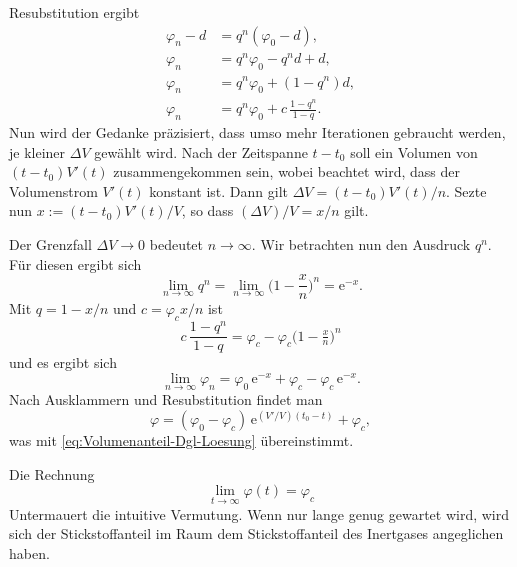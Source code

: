 \documentclass[a4paper,10pt,fleqn,twocolumn,twoside]{scrartcl}
\numberwithin{equation}{section}
\newcommand{\ee}{\mathrm e}
\begin{document}
Resubstitution ergibt
\begin{align}
\varphi_n-d &= q^n (\varphi_0-d),\\
\varphi_n &= q^n\varphi_0-q^n d+d,\\
\varphi_n &= q^n\varphi_0+(1-q^n)d,\\
\varphi_n &= q^n\varphi_0+c\,\frac{1-q^n}{1-q}.
\end{align}
Nun wird der Gedanke präzisiert, dass umso mehr Iterationen
gebraucht werden, je kleiner $\Delta V$ gewählt wird.
Nach der Zeitspanne $t-t_0$ soll ein Volumen von $(t-t_0)V'(t)$
zusammengekommen sein, wobei beachtet wird, dass der Volumenstrom
$V'(t)$ konstant ist. Dann gilt $\Delta V = (t-t_0)V'(t)/n$.
Sezte nun $x:=(t-t_0)V'(t)/V$, so dass $(\Delta V)/V=x/n$ gilt.
 
Der Grenzfall $\Delta V\to 0$ bedeutet $n\to\infty$.
Wir betrachten nun den Ausdruck $q^n$. Für diesen ergibt sich%
\begin{equation}
\lim_{n\to\infty} q^n = \lim_{n\to\infty} \Big(1-\frac{x}{n}\Big)^n
= \ee^{-x}.
\end{equation}
Mit $q=1-x/n$ und $c=\varphi_c x/n$ ist
\begin{equation}
c\,\frac{1-q^n}{1-q}
= \varphi_c -\varphi_c\big(1-\tfrac{x}{n}\big)^n
\end{equation}
und es ergibt sich
\begin{equation}
\lim_{n\to\infty}\varphi_n = \varphi_0\,\ee^{-x}+\varphi_c-\varphi_c\,\ee^{-x}.
\end{equation}
Nach Ausklammern und Resubstitution findet man
\begin{equation}
\varphi = (\varphi_0-\varphi_c)\,\ee^{(V'/V)(t_0-t)}+\varphi_c,
\end{equation}
was mit \eqref{eq:Volumenanteil-Dgl-Loesung} übereinstimmt.

Die Rechnung
\begin{equation}
\lim_{t\to\infty}\varphi(t) = \varphi_c
\end{equation}
Untermauert die intuitive Vermutung. Wenn nur lange genug gewartet
wird, wird sich der Stickstoffanteil im Raum dem Stickstoffanteil des
Inertgases angeglichen haben.
\end{document}
